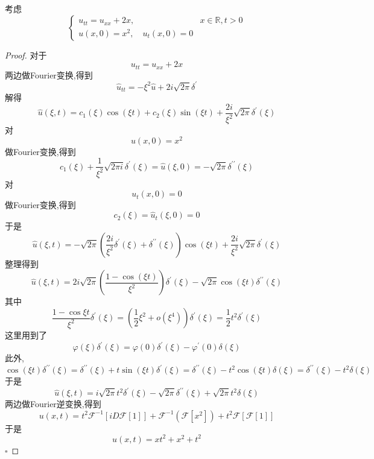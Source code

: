 \documentclass[../../main.tex]{subfiles}
\begin{document}
\begin{problem}
    考虑 \[
    \begin{cases} u_{tt}= u_{x x}+ 2x,&x\in \mathbb{R} ,t> 0\\ 
     u\left( x,0 \right)= x^{2},\quad u_{t}\left( x,0 \right)= 0   \end{cases} 
    \]
\end{problem}
\begin{proof}
    对于 \[
    u_{tt}= u_{xx}+ 2x
    \]两边做Fourier变换,得到 \[
    \hat{u}_{tt}= - \xi ^{2} \hat{u}+ 2i\sqrt{2\pi } \delta ^{\prime} 
    \]解得 \[
    \hat{u}\left(  \xi ,t \right)= c_1\left(  \xi  \right)\cos \left(  \xi t \right)+ c_2\left(  \xi  \right)\sin \left(  \xi t \right)+ \frac{2i }{ \xi ^{2} }  \sqrt{2\pi } \delta ^{\prime} \left(  \xi  \right)      
    \]对 \[
    u\left( x,0 \right)= x^{2} 
    \]做Fourier变换,得到 \[
   c_1\left(  \xi  \right)+ \frac{1 }{ \xi ^{2} }\sqrt{2\pi i} \delta ^{\prime} \left(  \xi  \right)=     \hat{u}\left(  \xi ,0 \right)=- \sqrt{2\pi }  \delta ^{\prime \prime} \left(  \xi  \right)  
    \]对 \[
    u_{t}\left( x,0 \right)= 0 
    \]做Fourier变换,得到 \[
   c_2\left(  \xi  \right)=   \hat{u}_{t}\left(  \xi ,0 \right)= 0 
    \]于是 \[
    \hat{u}\left(  \xi ,t \right)= -\sqrt{2\pi }\left( \frac{2i }{ \xi ^{2} } \delta ^{\prime} \left(  \xi  \right)+ \delta ^{\prime \prime} \left(  \xi  \right)    \right)  \cos \left(  \xi t \right)+ \frac{2i }{ \xi ^{2} }\sqrt{2\pi }   \delta ^{\prime} \left(  \xi  \right)   
    \]整理得到 \[
    \hat{u}\left(  \xi ,t \right)=2i\sqrt{2\pi }\left( \frac{ 1-\cos \left(  \xi t \right) }{ \xi ^{2} } \right)    \delta ^{\prime} \left(  \xi  \right)-\sqrt{2\pi }\cos \left(  \xi t \right) \delta ^{\prime \prime} \left(  \xi  \right)   
    \]其中 \[
    \frac{1-\cos  \xi t }{ \xi ^{2} } \delta ^{\prime} \left(  \xi  \right)=  \left(  \frac{1}{2} \xi ^{2}+ o\left(  \xi ^{4} \right)  \right) \delta ^{\prime} \left(  \xi  \right)=   \frac{1}{2} t ^{2} \delta ^{\prime} \left(  \xi  \right)
    \]这里用到了 \[
     \varphi \left(  \xi  \right) \delta ^{\prime} \left(  \xi  \right)=  \varphi \left( 0 \right) \delta ^{\prime} \left(  \xi  \right)- \varphi ^{\prime} \left( 0 \right) \delta \left(  \xi  \right)      
    \]此外, \[
    \cos \left(  \xi t \right) \delta ^{\prime \prime} \left(  \xi  \right)=    \delta ^{\prime \prime} \left(  \xi  \right) + t\sin \left(  \xi t \right) \delta ^{\prime} \left(  \xi  \right)=  \delta ^{\prime \prime} \left(  \xi  \right)- t^{2}\cos \left(  \xi t \right) \delta \left(  \xi  \right)=  \delta ^{\prime \prime} \left(  \xi  \right)- t^{2} \delta \left(  \xi  \right)       
    \]于是 \[
    \hat{u}\left(  \xi ,t \right)=i\sqrt{2\pi }t^{2} \delta ^{\prime} \left(  \xi  \right)-\sqrt{2\pi } \delta ^{\prime \prime} \left(  \xi  \right) +  \sqrt{2\pi }t^{2} \delta \left(  \xi  \right)  
    \]两边做Fourier逆变换,得到 \[
    u\left( x,t \right)= t^{2}\mathcal{F}^{-1} [i D \mathcal{F}[1]] + \mathcal{F}^{-1} \left( \mathcal{F}[x^{2}] \right) + t^{2}\mathcal{F}[\mathcal{F}[1]]
    \]于是 \[
    u\left( x,t \right)= xt^{2}+ x^{2}+ t^{2} 
    \]
    \hfill $\square$
\end{proof}
\end{document}
